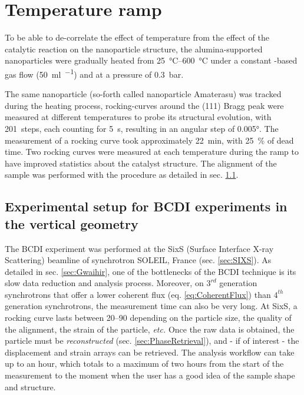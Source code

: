 \section{Temperature ramp}\label{sec:TempRampBCDI}


To be able to de-correlate the effect of temperature from the effect of the catalytic reaction on the nanoparticle structure, the alumina-supported nanoparticles were gradually heated from \qtyrange{25}{600}{\degreeCelsius} under a constant \argon-based gas flow (\qty{50}{\ml\per\min}) and at a pressure of \qty{0.3}{\bar}.

The same nanoparticle (so-forth called nanoparticle Amaterasu) was tracked during the heating process, rocking-curves around the (111) Bragg peak were measured at different temperatures to probe its structural evolution, with \qty{201}{steps}, each counting for \qty{5}{\second}, resulting in an angular step of \ang{0.005}.
The measurement of a rocking curve took approximately \qty{22}{\minute}, with \qty{25}{\percent} of dead time.
Two rocking curves were measured at each temperature during the ramp to have improved statistics about the catalyst structure.
The alignment of the sample was performed with the procedure as detailed in sec. \ref{sec:BCDISetup}.

\subsection{Experimental setup for BCDI experiments in the vertical geometry}\label{sec:BCDISetup}

The BCDI experiment was performed at the SixS (Surface Interface X-ray Scattering) beamline of synchrotron SOLEIL, France (sec. \ref{sec:SIXS}).
As detailed in sec. \ref{sec:Gwaihir}, one of the bottlenecks of the BCDI technique is its slow data reduction and analysis process.
Moreover, on $3^{rd}$ generation synchrotrons that offer a lower coherent flux (eq. \ref{eq:CoherentFlux}) than $4^{th}$ generation synchrotrons, the measurement time can also be very long.
At SixS, a rocking curve lasts between \qtyrange{20}{90}{\min} depending on the particle size, the quality of the alignment, the strain of the particle, \textit{etc.}
Once the raw data is obtained, the particle must be \textit{reconstructed} (sec. \ref{sec:PhaseRetrieval}), and - if of interest - the displacement and strain arrays can be retrieved.
The analysis workflow can take up to an hour, which totals to a maximum of two hours from the start of the measurement to the moment when the user has a good idea of the sample shape and structure.

